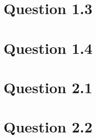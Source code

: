 \documentclass[10pt]{article}
\begin{document}
\section*{Question 1.3} %
\label{sec:question_1_3}


\section*{Question 1.4} %
\label{sec:question_1_4}


\section*{Question 2.1} %
\label{sec:question_2_1}


\section*{Question 2.2} %
\label{sec:question_2_2}




%
%
\end{document}
